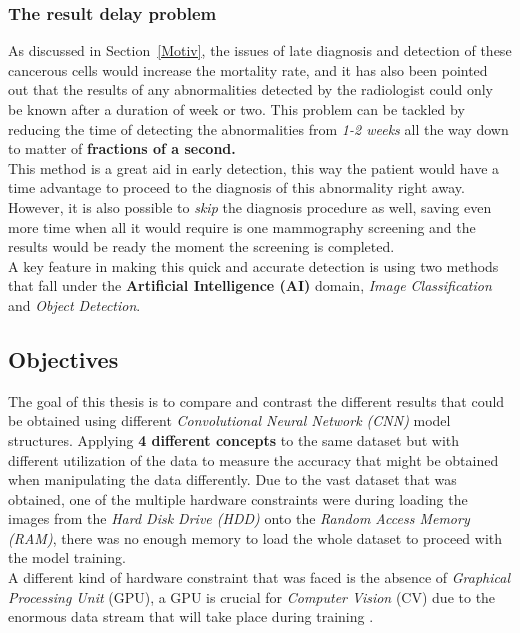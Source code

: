 \documentclass[12pt]{extarticle}
\begin{document}
	\subsubsection{The result delay problem}\label{delay problem}
	As discussed in Section~\ref{Motiv}, the issues of late diagnosis and detection of these cancerous cells would increase the mortality rate, and it has also been pointed out that the results of any abnormalities detected by the radiologist could only be known after a duration of week or two. This problem can be tackled by reducing the time of detecting the abnormalities from \emph{1-2 weeks} all the way down to matter of \textbf{fractions of a second.}\\[5mm]
	This method is a great aid in early detection, this way the patient would have a time advantage to proceed to the diagnosis of this abnormality right away. However, it is also possible to \emph{skip} the diagnosis procedure as well, saving even more time when all it would require is one mammography screening and the results would be ready the moment the screening is completed.\\[5mm]
	A key feature in making this quick and accurate detection is using two methods that fall under the \textbf{Artificial Intelligence (AI)} domain, \emph{Image Classification} and \emph{Object Detection}.
	
	\subsection{Objectives}\label{Obj}
	The goal of this thesis is to compare and contrast the different results that could be obtained using different \emph{Convolutional Neural Network (CNN)} model structures. Applying \textbf{4 different concepts} to the same dataset but with different utilization of the data to measure the accuracy that might be obtained when manipulating the data differently. Due to the vast dataset that was obtained, one of the multiple hardware constraints were during loading the images from the \emph{Hard Disk Drive (HDD)} onto the \emph{Random Access Memory (RAM)}, there was no enough memory to load the whole dataset to proceed with the model training. \\[5mm]
	A different kind of hardware constraint that was faced is the absence of \emph{Graphical Processing Unit} (GPU), a GPU is crucial for \emph{Computer Vision} (CV) due to the enormous data stream that will take place during training \cite{GPU}.
\end{document}
